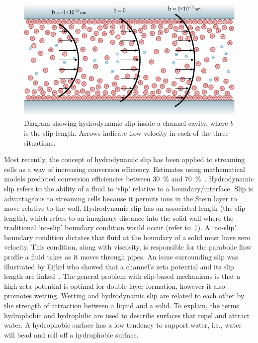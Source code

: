     \begin{figure}
      \centering
      \includegraphics[height=6cm]{content/pt1/graphics/HydrodynamicSlip}
      \caption[Diagram showing hydrodynamic slip inside a channel cavity.]{\label{fig:HydrodynamicSlip}Diagram showing hydrodynamic slip inside a channel cavity, where $b$ is the slip length. Arrows indicate flow velocity in each of the three situations.}
    \end{figure}
    Most recently, the concept of hydrodynamic slip has been applied to streaming cells as a way of increasing conversion efficiency.
    Estimates using mathematical models predicted conversion efficiencies between \SI{30}{\percent} and \SI{70}{\percent}~\cite{Pennathur2007, Davidson2008a, Ren2008}.
    Hydrodynamic slip refers to the ability of a fluid to `slip' relative to a boundary/interface.
    Slip is advantageous to streaming cells because it permits ions in the Stern layer to move relative to the wall.
    Hydrodynamic slip has an associated length (the slip-length), which refers to an imaginary distance into the solid wall where the traditional `no-slip' boundary condition would occur (refer to~\cref{fig:HydrodynamicSlip}).
    A `no-slip' boundary condition dictates that fluid at the boundary of a solid must have zero velocity.
    This condition, along with viscosity, is responsible for the parabolic flow profile a fluid takes as it moves through pipes.
    An issue surrounding slip was illustrated by Eijkel who showed that a channel's zeta potential and its slip length are linked~\cite{Eijkel2007}.
    The general problem with slip-based mechanisms is that a high zeta potential is optimal for double layer formation, however it also promotes wetting.
    Wetting and hydrodynamic slip are related to each other by the strength of attraction between a liquid and a solid.
    To explain, the terms hydrophobic and hydrophilic are used to describe surfaces that repel and attract water.
    A hydrophobic surface has a low tendency to support water, i.e., water will bead and roll off a hydrophobic surface.
